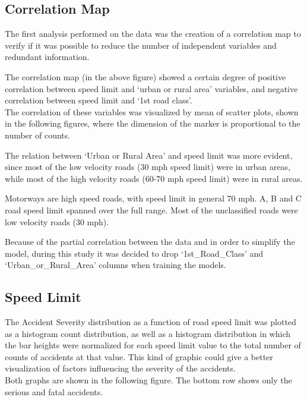 \documentclass[11pt]{article}
\begin{document}
    \hypertarget{correlation-map}{%
\subsection{Correlation Map}\label{correlation-map}}

The first analysis performed on the data was the creation of a correlation map to verify if it was possible to reduce the number of independent variables and redundant information.

    \begin{center}
    \end{center}

The correlation map (in the above figure) showed a certain degree of positive correlation between speed limit and `urban or rural area' variables, and negative correlation between speed limit and `1st road class'.\\
The correlation of these variables was visualized by mean of scatter plots, shown in the following figures, where the dimension of the marker is proportional to the number of counts.

    \begin{center}
    \end{center}

The relation between `Urban or Rural Area' and speed limit was more evident, since most of the low velocity roads (30 mph speed limit) were in urban areas, while most of the high velocity roads (60-70 mph speed limit) were in rural areas.

Motorways are high speed roads, with speed limit in general 70 mph. A, B and C road speed limit spanned over the full range. Most of the unclassified roads were low velocity roads (30 mph).

Because of the partial correlation between the data and in order to simplify the model, during this study it was decided to drop `1st\_Road\_Class' and `Urban\_or\_Rural\_Area' columns when training the models.

    \hypertarget{speed-limit}{%
\subsection{Speed Limit}\label{speed-limit}}

The Accident Severity distribution as a function of road speed limit was plotted as a histogram count distribution, as well as a histogram distribution in which the bar heights were normalized for each speed limit value to the total number of counts of accidents at that value. This kind of graphic could give a better visualization of factors influencing the severity of the accidents.\\
Both graphs are shown in the following figure. The bottom row shows only the serious and fatal accidents.
\end{document}

